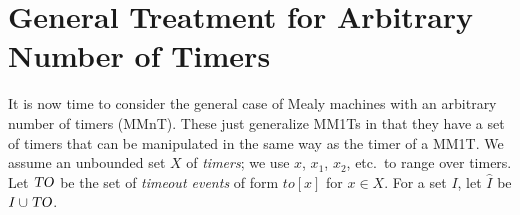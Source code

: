 \newcommand{\natplus}{\nat^{>0}}
\newcommand{\realsplus}{\bbbr^{\geq 0}}
\newcommand{\stoptimer}{\mathit{kill}}
\newcommand{\tosymbol}{\mathit{to}}
\newcommand{\toevent}[1]{\mathit{to}[#1]}
\newcommand{\toevents}{\mbox{\sl TO}}
\newcommand{\extinputs}{\hat{I}}
\newcommand{\acttimers}{\mathit{active}}
\newcommand{\expirable}{\mathit{expirable}}
\newcommand{\tvals}{\kappa}
\newcommand{\delay}[2]{t_{[#1:#2]}}
\newcommand{\timerof}[2]{x_{#1}^{#2}}
\newcommand{\constrof}[1]{\phi_{#1}}
\newcommand{\post}{\mathit{post}}

\newcommand{\conc}{\cdot}
\newcommand{\tuple}[1]{\langle #1\rangle}
\newcommand{\set}[1]{\lbrace #1\rbrace}
\newcommand{\vect}[2]{{#1}_1 , \ldots , {#1}_{#2}}
\newcommand{\setcomp}[2]{\set{#1 ~:~ #2}}
\newcommand{\domof}[1]{\dom(#1)}
\newcommand{\ranof}[1]{\ran(#1)}
\newcommand{\vars}{\mathcal{X}}
\newcommand{\varsof}[1]{\vars(#1)}
\newcommand{\ctimers}{X}
\newcommand{\remap}{\pi}
\newcommand{\remapinst}{\rho}
\newcommand{\normalize}{\gamma}
\newcommand{\normalizeof}[2]{\normalize_{#2}^{#1}}
\newcommand{\timerbij}{\gamma}
\newcommand{\timerequiv}{\pi}
\newcommand{\extendedby}{\lhd}
\newcommand{\uttrace}{\textsf{tr}}
\newcommand{\uttraceof}[1]{\uttrace(#1)}
\newcommand{\uttracesof}[1]{\textsf{Tr}(#1)}
\newcommand{\strace}{\textsf{tr}_s}
\newcommand{\ssuffix}{v_s}
\newcommand{\suftraces}{\textsf{Tr}_s}
\newcommand{\pinpof}[1]{\textit{inp}_p(#1)}
\newcommand{\sinpof}[1]{\textit{inp}_s(#1)}
\newcommand{\symbinpof}[1]{\textit{symbinp}(#1)}
\newcommand{\word}{w}
\newcommand{\smap}{{\cal O}}
\newcommand{\smappre}{{\cal O_p}}
\newcommand{\smapsuf}{{\cal O_s}}
\newcommand{\obspre}{{\cal O_U}}

\section{General Treatment for Arbitrary Number of Timers}

It is now time to consider the general case of
Mealy machines with an arbitrary number of timers (MMnT). 
These just generalize MM1Ts in that they have a set of timers that
can be manipulated in the same way as the timer of a MM1T.
We assume an unbounded set $X$ of {\em timers};
we use $x$, $x_1$, $x_2$, etc.\ to range over timers.
Let $\toevents$ be the set of {\em timeout events} of form
$\toevent{x}$ for $x \in X$.
For a set $I$, let $\extinputs$ be $I \cup \toevents$.

